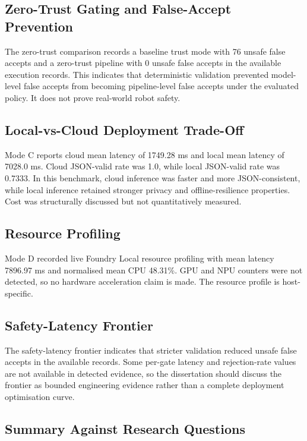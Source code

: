 \documentclass[sigconf,nonacm]{acmart}
\begin{document}
\subsection{Zero-Trust Gating and False-Accept Prevention}

The zero-trust comparison records a baseline trust mode with 76 unsafe false accepts and a zero-trust pipeline with 0 unsafe false accepts in the available execution records. This indicates that deterministic validation prevented model-level false accepts from becoming pipeline-level false accepts under the evaluated policy. It does not prove real-world robot safety.

\subsection{Local-vs-Cloud Deployment Trade-Off}

Mode C reports cloud mean latency of 1749.28 ms and local mean latency of 7028.0 ms. Cloud JSON-valid rate was 1.0, while local JSON-valid rate was 0.7333. In this benchmark, cloud inference was faster and more JSON-consistent, while local inference retained stronger privacy and offline-resilience properties. Cost was structurally discussed but not quantitatively measured.

\subsection{Resource Profiling}

Mode D recorded live Foundry Local resource profiling with mean latency 7896.97 ms and normalised mean CPU 48.31\%. GPU and NPU counters were not detected, so no hardware acceleration claim is made. The resource profile is host-specific.

\subsection{Safety-Latency Frontier}

The safety-latency frontier indicates that stricter validation reduced unsafe false accepts in the available records. Some per-gate latency and rejection-rate values are not available in detected evidence, so the dissertation should discuss the frontier as bounded engineering evidence rather than a complete deployment optimisation curve.

\subsection{Summary Against Research Questions}
\end{document}
